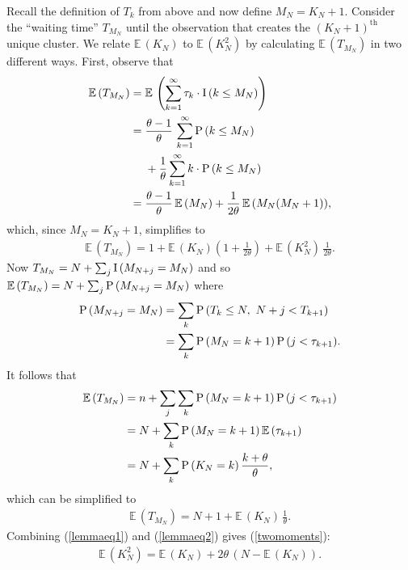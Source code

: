 \documentclass[twoside]{article}
\begin{document}
Recall the definition of $T_k$ from above and now define $M_N = K_N +
1$.  Consider the ``waiting time'' $T_{M_N}$ until the observation
that creates the $(K_N + 1)^{\textrm{th}}$ unique cluster.  We relate
$\mathbb{E}\,(K_N)$ to $\mathbb{E}\,(K_N^2)$ by calculating
$\mathbb{E}\, (T_{M_N})$ in two different ways.  First, observe that
\begin{align*}
\mathbb{E}\, (T_{M_N}) &= \mathbb{E}\,
\left(\sum\limits_{k=1}^\infty \tau_k \cdot {\rm I}\, (k \leq M_N)
\right) \\ &= \frac{\theta -1}{\theta}\,
\sum\limits_{k=1}^\infty {\rm P}\, (k \leq M_N) \\ & \,\,\,\,\,\,\,\, + \frac{1}{\theta}
\sum\limits_{k=1}^\infty k \cdot {\rm P}\, (k \leq M_N) \\ &=
\frac{\theta -1}{\theta}\, \mathbb{E}\, (M_N) + \frac{1}{2 \theta}\,
\mathbb{E}\, (M_N (M_N + 1)),
\end{align*}
which, since $M_N = K_N + 1$, simplifies to 
\begin{align}
\mathbb{E}\, (T_{M_N})  = 1 + \mathbb{E}\, (K_N) \left( 1 + \frac{1}{2 \theta} \right) + \mathbb{E}\, (K_N^2)\, \frac{1}{2 \theta}.   \label{lemmaeq1}
\end{align}
Now $T_{M_N} = N + \sum_{j} {\rm I}\, (M_{N + j} = M_N)$ and so
$\mathbb{E}\, (T_{M_N}) = N + \sum_{j} {\rm P}\, (M_{N + j} = M_N)$
where
\begin{align*}
{\rm P}\,(M_{N + j} = M_N) &= \sum_k {\rm P}\,(T_k \leq N, \ N + j < T_{k + 1}) \\
&= \sum_k {\rm P}\,(M_N = k + 1)\, {\rm P}\,(j < \tau_{k + 1}).
\end{align*}
It follows that
\begin{align*}
\mathbb{E}\,(T_{M_N}) &= n + \sum_j \sum_k {\rm P}\,(M_N = k + 1)\, {\rm P}\,(j < \tau_{k + 1}) \\
&= N + \sum_k {\rm P}\,(M_N = k + 1)\, \mathbb{E}\,(\tau_{k + 1}) \\
&= N + \sum_k {\rm P}\,(K_N = k)\, \frac{k+\theta}{\theta},
\end{align*}
which can be simplified to 
\begin{align}
\mathbb{E}\,(T_{M_N})  = N + 1 + \mathbb{E}\,(K_N)\, \frac{1}{\theta}.   \label{lemmaeq2}
\end{align}
Combining (\ref{lemmaeq1}) and (\ref{lemmaeq2}) gives (\ref{twomoments}): 
\begin{align*}
\mathbb{E}\,(K_N^2) = \mathbb{E}\,(K_N) + 2\theta\,(N - \mathbb{E}\,(K_N)). 
\end{align*}
\end{document}
